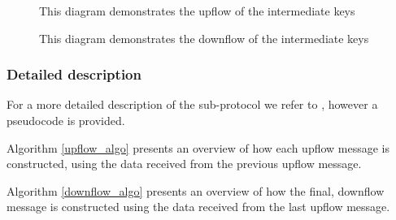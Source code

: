 \begin{figure}[H]
  \begin{minipage}{0.49\textwidth}
    \caption{This diagram demonstrates the upflow of the intermediate keys}    
    \label{figures:gka_upflow}
  \end{minipage}
  \begin{minipage}{0.49\textwidth}
    \caption{This diagram demonstrates the downflow of the intermediate keys}
    \label{figures:gka_downflow}
  \end{minipage}
\end{figure}

\subsubsection{Detailed description}
For a more detailed description of the sub-protocol we refer to \cite{mpenc}, however a pseudocode is provided.

Algorithm \ref{upflow_algo} presents an overview of how each upflow message is constructed, using the data received from the previous upflow message.

Algorithm \ref{downflow_algo} presents an overview of how the final, downflow message is constructed using the data received from the last upflow message.

